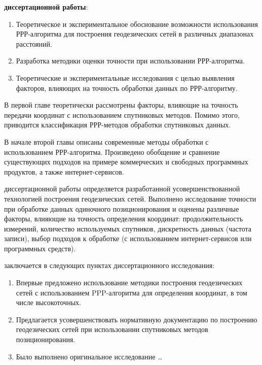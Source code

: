 {\tasks} \textbf{диссертационной работы}:
\begin{enumerate}[beginpenalty=10000] %
	\item Теоретическое и экспериментальное обоснование возможности использования РРР-алгоритма для построения геодезических сетей в различных диапазонах расстояний.
	\item Разработка методики оценки точности при использовании РРР-алгоритма.
	\item Теоретические и экспериментальные исследования с целью выявления факторов, влияющих на точность обработки данных по РРР-алгоритму.
\end{enumerate}

{\theoretical}

В первой главе теоретически рассмотрены факторы, влияющие на точность передачи координат с использованием спутниковых методов. Помимо этого, приводится классификация РРР-методов обработки спутниковых данных.

В начале второй главы описаны современные методы обработки с использованием РРР-алгоритма. Произведено обобщение и сравнение существующих подходов на примере коммерческих и свободных программных продуктов, а также интернет-сервисов.

{\influence} диссертационной работы определяется разработанной усовершенствованной технологией построения геодезических сетей. Выполнено исследование точности при обработке данных одиночного позиционирования и оценены различные факторы, влияющие на точность определения координат: продолжительность измерений, количество используемых спутников, дискретность данных (частота записи), выбор подходов к обработке (с использованием интернет-сервисов или программных средств).

{\novelty} заключается в следующих пунктах диссертационного исследования:
\begin{enumerate}[beginpenalty=10000] %
	\item Впервые предложено использование методики построения геодезических сетей с использованием PPP-алгоритма для определения координат, в том числе высокоточных.
	\item Предлагается усовершенствовать нормативную документацию по построению геодезических сетей при использовании спутниковых методов позиционирования.
	\item Было выполнено оригинальное исследование \ldots
\end{enumerate}

